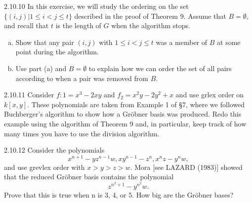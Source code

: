 \documentclass[twoside]{article}
\begin{document}
\newpage

\begin{ejercicio}{2.10.10}
In this exercise, we will study the ordering on the set $\{(i, j) | 1 ≤ i < j ≤ t\}$ described
in the proof of Theorem 9. Assume that $B = ∅$, and recall that $t$ is the length of $G$ when
the algorithm stops.
\begin{enumerate}[a.]
\item Show that any pair $(i, j)$ with $1 ≤ i < j ≤ t$ was a member of $B$ at some point during
the algorithm.
\item Use part (a) and $B = ∅$ to explain how we can order the set of all pairs according to
when a pair was removed from $B$.
\end{enumerate}
\end{ejercicio}
\begin{solucion}
\end{solucion}

\newpage

\begin{ejercicio}{2.10.11}
Consider $f:1 = x^3−2xy$ and $f_2 = x^2y−2y^2+x$ and use grlex order on $k[x, y]$. These polynomials
are taken from Example 1 of §7, where we followed Buchberger’s algorithm
to show how a Gröbner basis was produced. Redo this example using the algorithm of
Theorem 9 and, in particular, keep track of how many times you have to use the division
algorithm.
\end{ejercicio}
\begin{solucion}


\end{solucion}
\newpage

\begin{ejercicio}{2.10.12}
Consider the polynomials
$$x^{n+1} − yz^{n−1}w, xy^{n−1} − z^n, x^nz − y^nw,$$
and use grevlex order with $x > y > z > w$. Mora [see LAZARD (1983)] showed that the
reduced Gröbner basis contains the polynomial
$$z^{n^2+1} − y^{n^2}
w.$$
Prove that this is true when n is 3, 4, or 5. How big are the Gröbner bases?
\end{ejercicio}
\begin{solucion}
\end{solucion}

\newpage
\end{document}
